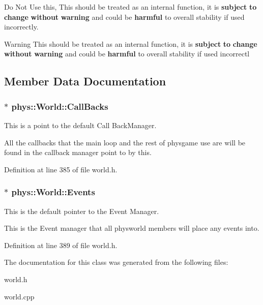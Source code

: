 Do Not Use this, This should be treated as an internal function, it is {\bfseries subject} {\bfseries to} {\bfseries change} {\bfseries without} {\bfseries warning} and could be {\bfseries harmful} to overall stability if used incorrectly. 

\begin{DoxyWarning}{Warning}
This should be treated as an internal function, it is {\bfseries subject} {\bfseries to} {\bfseries change} {\bfseries without} {\bfseries warning} and could be {\bfseries harmful} to overall stability if used incorrectl 
\end{DoxyWarning}


\subsection{Member Data Documentation}
\hypertarget{classphys_1_1World_a22a1624c63198f49fdf8e448881bdb2e}{
\subsubsection[{CallBacks}]{$\ast$ {\bf phys::World::CallBacks}}}
\label{da/ddf/classphys_1_1World_a22a1624c63198f49fdf8e448881bdb2e}


This is a point to the default Call BackManager. 

All the callbacks that the main loop and the rest of physgame use are will be found in the callback manager point to by this. 

Definition at line 385 of file world.h.

\hypertarget{classphys_1_1World_ad0b13f1f3caf0342f56671b522543453}{
\subsubsection[{Events}]{$\ast$ {\bf phys::World::Events}}}
\label{da/ddf/classphys_1_1World_ad0b13f1f3caf0342f56671b522543453}


This is the default pointer to the Event Manager. 

This is the Event manager that all physworld members will place any events into. 

Definition at line 389 of file world.h.



The documentation for this class was generated from the following files:\begin{DoxyCompactItemize}
\item 
world.h\item 
world.cpp\end{DoxyCompactItemize}
